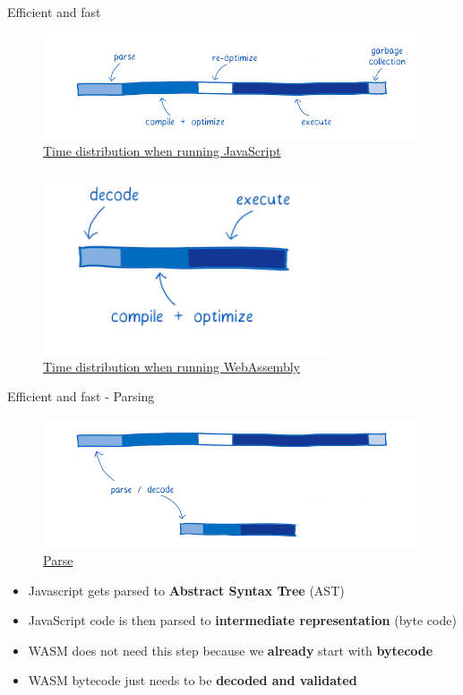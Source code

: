 \documentclass{beamer}
\begin{document}
\begin{frame}{Efficient and fast}
    \begin{figure}
        \includegraphics[scale=0.3]{./images/javascriptgraph.png}
        \caption{\href{https://www.smashingmagazine.com/2017/05/abridged-cartoon-introduction-webassembly/}{Time distribution when running JavaScript}}
    \end{figure}
    \begin{figure}
        \includegraphics[scale=0.4]{./images/wasmgraph.png}
        \caption{\href{https://www.smashingmagazine.com/2017/05/abridged-cartoon-introduction-webassembly/}{Time distribution when running WebAssembly}}
    \end{figure}
\end{frame}

\begin{frame}{Efficient and fast - Parsing}
    \begin{figure}
        \includegraphics[scale=0.2]{./images/pasedecode.png}
        \caption{\href{https://www.smashingmagazine.com/2017/05/abridged-cartoon-introduction-webassembly/}{Parse}}
    \end{figure}
    \begin{itemize}
        \item Javascript gets parsed to \textbf{Abstract Syntax Tree} (AST)
        \item JavaScript code is then parsed to \textbf{intermediate representation} (byte code) 
        \item WASM does not need this step because we \textbf{already} start with \textbf{bytecode}
        \item WASM bytecode just needs to be \textbf{decoded and validated}
    \end{itemize}
\end{frame}
\end{document}
